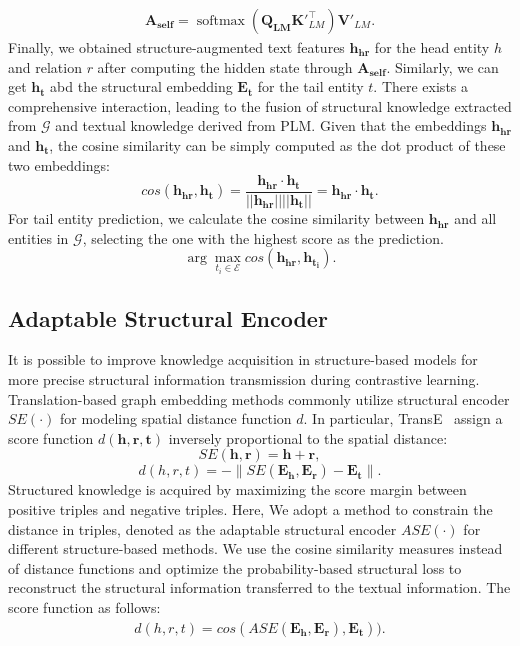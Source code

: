 \documentclass[11pt]{article}
\begin{document}
\begin{equation}
\begin{aligned}
    \mathbf{A_{self}}=\operatorname{softmax}(\mathbf{Q_{LM}}{\mathbf{K}'^{\top}_{LM}})\mathbf{V}'_{LM}.
\end{aligned}
\end{equation}
Finally, we obtained structure-augmented text features $\mathbf{h_{hr}}$ for the head entity $h$ and relation $r$ after computing the hidden state through $\mathbf{A_{self}}$. 
Similarly, we can get $\mathbf{h_{t}}$ abd the structural embedding $\mathbf{E_{t}}$ for the tail entity $t$. There exists a comprehensive interaction, leading to the fusion of structural knowledge extracted from $\mathcal{G}$ and textual knowledge derived from PLM. Given that the embeddings $\mathbf{h_{hr}}$ and $\mathbf{h_{t}}$, the cosine similarity can be simply computed as the dot product of these two embeddings:
\begin{equation}
    cos(\mathbf{h_{hr}}, \mathbf{h_{t}}) =\frac{\mathbf{h_{hr}} \cdot \mathbf{h_{t}}}{||\mathbf{h_{hr}}|| ||\mathbf{h_{t}}||} = \mathbf{h_{hr}} \cdot \mathbf{h_{t}}.
\label{cossim}
\end{equation}
For tail entity prediction, we calculate the cosine similarity between $\mathbf{h_{hr}}$ and all entities in $\mathcal{G}$, selecting the one with the highest score as the prediction.
\begin{equation}
\arg\max\limits_{t_{i}\in \mathcal{E}}{cos(\mathbf{h_{hr}}, \mathbf{h_{t_{i}}})}.
\end{equation}
\subsection{Adaptable Structural Encoder}
It is possible to improve knowledge acquisition in structure-based models for more precise structural information transmission during contrastive learning. Translation-based graph embedding methods commonly utilize structural encoder $SE(\cdot)$ for modeling spatial distance function $d$. In particular, TransE~\cite{bordes2013translating} assign a score function $d(\mathbf{h},\mathbf{r},\mathbf{t})$ inversely proportional to the spatial distance: 
\begin{equation}
SE(\mathbf{h}, \mathbf{r})=\mathbf{h} + \mathbf{r},
\end{equation}
\begin{equation}
d(h, r, t)=-\lVert SE(\mathbf{E_{h}}, \mathbf{E_{r}})-\mathbf{E_{t}} \rVert. 
\end{equation}
Structured knowledge is acquired by maximizing the score margin between positive triples and negative triples. Here, We adopt a method to constrain the distance in triples, denoted as the adaptable structural encoder $ASE(\cdot)$ for different structure-based methods. We use the cosine similarity measures instead of distance functions and optimize the probability-based structural loss to reconstruct the structural information transferred to the textual information. The score function as follows:
\begin{equation}
\begin{aligned}
d(h, r, t) = cos(ASE(\mathbf{E_{h}}, \mathbf{E_{r}}), \mathbf{E_{t}})).
\end{aligned}
\end{equation}
\end{document}

